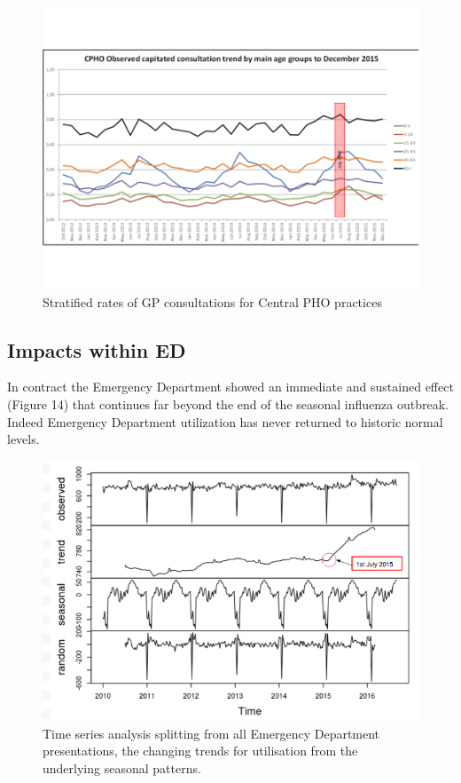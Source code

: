 \documentclass[11pt,a4paper]{article}
\begin{document}
\begin{figure}[htp]
\centering
\includegraphics[scale=0.30]{GPu13.png}
\caption{Stratified rates of GP consultations for Central PHO practices}
\label{Age stratified General Practice consultations}
\end{figure}

\subsection{Impacts within ED}
In contract the Emergency Department showed an immediate and sustained effect (Figure 14) that continues far beyond the end of the seasonal influenza outbreak. Indeed Emergency Department utilization has never returned to historic normal levels.\\

\begin{figure}[htp]
\centering
\includegraphics[scale=0.60]{TS_ED.png}
\caption{Time series analysis splitting from all Emergency Department presentations, the changing trends for utilisation from the underlying seasonal patterns.}
\label{Time series analysis of Emergency Department presentations}
\end{figure}
\end{document}
